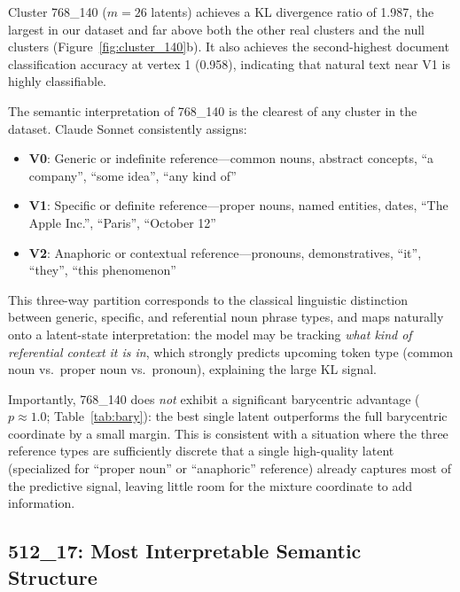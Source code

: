 \documentclass{article}
\begin{document}
Cluster 768\_140 ($m = 26$ latents) achieves a KL divergence ratio of 1.987, the
largest in our dataset and far above both the other real clusters and the null clusters
(Figure~\ref{fig:cluster_140}b).  It also achieves the second-highest document
classification accuracy at vertex 1 (0.958), indicating that natural text near V1 is
highly classifiable.

The semantic interpretation of 768\_140 is the clearest of any cluster in the
dataset.  Claude Sonnet consistently assigns:
\begin{itemize}
  \item \textbf{V0}: Generic or indefinite reference---common nouns, abstract concepts,
    ``a company'', ``some idea'', ``any kind of''
  \item \textbf{V1}: Specific or definite reference---proper nouns, named entities,
    dates, ``The Apple Inc.'', ``Paris'', ``October 12''
  \item \textbf{V2}: Anaphoric or contextual reference---pronouns, demonstratives,
    ``it'', ``they'', ``this phenomenon''
\end{itemize}
This three-way partition corresponds to the classical linguistic distinction between
generic, specific, and referential noun phrase types, and maps naturally onto a
latent-state interpretation: the model may be tracking \emph{what kind of referential
context it is in}, which strongly predicts upcoming token type (common noun vs.\
proper noun vs.\ pronoun), explaining the large KL signal.

Importantly, 768\_140 does \emph{not} exhibit a significant barycentric advantage
($p \approx 1.0$; Table~\ref{tab:bary}): the best single latent outperforms
the full barycentric coordinate by a small margin.  This is consistent with a
situation where the three reference types are sufficiently discrete that a single
high-quality latent (specialized for ``proper noun'' or ``anaphoric'' reference)
already captures most of the predictive signal, leaving little room for the mixture
coordinate to add information.

\subsection{512\_17: Most Interpretable Semantic Structure}
\label{sec:highlight_17}
\end{document}

